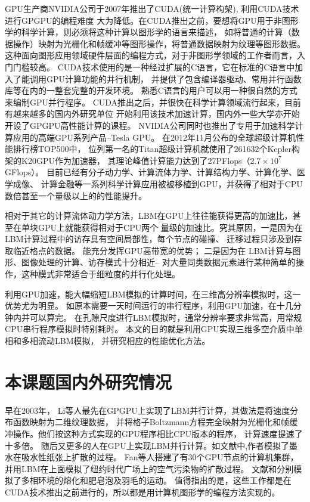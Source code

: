 GPU生产商NVIDIA公司于2007年推出了CUDA(统一计算构架), 利用CUDA技术进行GPGPU的编程难度
大为降低。在CUDA推出之前，要想将GPU用于非图形学的科学计算，则必须将这种计算以图形学的语言来描述，
如将普通的计算（数据操作）映射为光栅化和帧缓冲等图形操作，将普通数据映射为纹理等图形数据。
这种面向图形应用领域硬件层面的编程方式，对于非图形学领域的工作者而言，入门门槛较高。
CUDA技术使用的是一种经过扩展的C语言，它在标准的C语言中加入了能调用GPU计算功能的并行机制，
并提供了包含编译器驱动、常用并行函数库等在内的一整套完整的开发环境。
熟悉C语言的用户可以用一种很自然的方式来编制GPU并行程序。
CUDA推出之后，并很快在科学计算领域流行起来，目前有越来越多的国内外研究单位
开始利用该技术加速计算，国内外一些大学亦开始开设了GPGPU高性能计算的课程。
NVIDIA公司同时也推出了专用于加速科学计算应用的高端GPU系列产品\---Tesla GPU。
在2012年11月公布的全球超级计算机性能排行榜TOP500中，
位列第一名的Titan超级计算机就使用了261632个Kepler构架的K20GPU作为加速器，
其理论峰值计算能力达到了27PFlops（$2.7\times10^7$GFlops）。
目前已经有分子动力学、计算流体力学、计算结构力学、计算化学、医学成像、
计算金融等一系列科学计算应用被被移植到GPU，并获得了相对于CPU数倍甚至一个量级以上的的性能提升。


相对于其它的计算流体动力学方法，LBM在GPU上往往能获得更高的加速比，甚至在单块GPU上就能获得相对于CPU两个
量级的加速比。究其原因，一是因为在LBM计算过程中的访存具有空间局部性，每个节点的碰撞、
迁移过程只涉及到存取临近格点的数据。 能充分发挥GPU高带宽的优势；
二是因为在 LBM计算与图形、图像处理的计算、访存模式十分相近\---
对大量同类数据元素进行某种简单的操作，这种模式非常适合于细粒度的并行化处理。

利用GPU加速，能大幅缩短LBM模拟的计算时间，在三维高分辨率模拟时，这一优势尤为明显。
如原本需要一天时间运行的串行程序，利用GPU加速，在十几分钟内并可以算完。
在孔隙尺度进行LBM模拟时，通常分辨率要求非常高，用常规CPU串行程序模拟时特别耗时。
本文的目的就是利用GPU实现三维多空介质中单相和多相流动LBM模拟，
并研究相应的性能优化方法。

\section{本课题国内外研究情况}
早在2003年， Li等人最先在GPGPU上实现了LBM并行计算，其做法是将速度分布函数映射为二维纹理数据，
并将格子Boltzmann方程完全映射为光栅化和帧缓冲操作。他们按这种方式实现的GPU程序相比CPU版本的程序，
计算速度提速了十多倍。
随后又更多的人在GPU上实现LBM并行计算。如文献\cite{chu2005moxi}中,作者模拟了墨水在吸水性纸张上扩散的过程。
Fan等人搭建了有30个GPU节点的计算机集群，并用LBM在上面模拟了纽约时代广场上的空气污染物的扩散过程。
文献\cite{zhu2006simulation}和\cite{wei2004lattice}分别模拟了多相环境的熔化和肥皂泡及羽毛的运动。
值得指出的是，这些工作都是在CUDA技术推出之前进行的，所以都是用计算机图形学的编程方法实现的。

